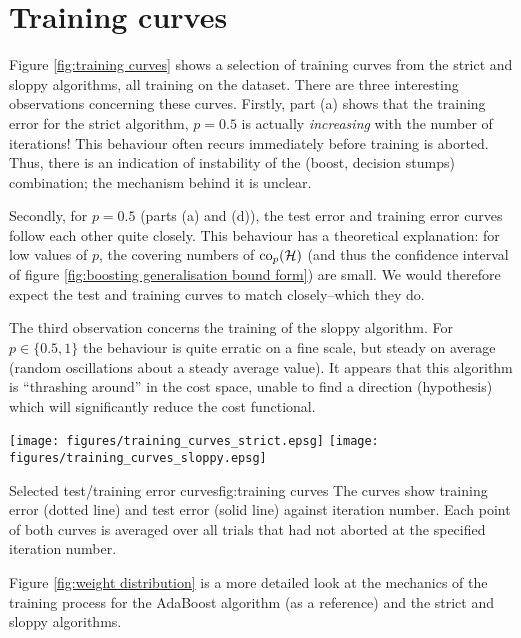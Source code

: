 \section{Training curves}
\label{sec:training curves}

Figure \ref{fig:training curves} shows a selection of training curves
from the strict and sloppy algorithms, all training on the 
dataset.  There are three interesting observations concerning these
curves.  Firstly, part (a) shows that the training error for the
strict algorithm, $p=0.5$ is actually \emph{increasing} with the number
of iterations!  This behaviour often recurs immediately before
training is aborted.  Thus, there is an indication of instability of
the (boost, decision stumps) combination; the mechanism behind it is
unclear.

Secondly, for $p=0.5$ (parts (a) and (d)), the test error and training
error curves follow each other quite closely.  This behaviour has a
theoretical explanation: for low values of $p$, the covering numbers
of $\mathrm{co}_p(\mathcal{H})$ (and thus the confidence interval of figure
\ref{fig:boosting generalisation bound form}) are small.  We would
therefore expect the test and training curves to match closely--which
they do.

The third observation concerns the training of the sloppy algorithm.
For $p \in \{0.5, 1\}$ the behaviour is quite erratic on a fine scale,
but steady on average (random oscillations about a steady average
value).  It appears that this algorithm is ``thrashing around'' in the
cost space, unable to find a direction (hypothesis) which will
significantly reduce the cost functional.

\begin{linefigure}
\begin{center}
\texttt{[image: figures/training\_curves\_strict.epsg]}
\texttt{[image: figures/training\_curves\_sloppy.epsg]}
\end{center}
\begin{capt}{Selected test/training error curves}{fig:training curves}
The curves show training error (dotted line) and test error (solid
line) against iteration number.  Each point of both curves is
averaged over all trials that had not aborted at the specified
iteration number.
\end{capt}
\end{linefigure}

Figure \ref{fig:weight distribution} is a more detailed look at the
mechanics of the training process for the AdaBoost algorithm (as a
reference) and the strict and sloppy algorithms.

